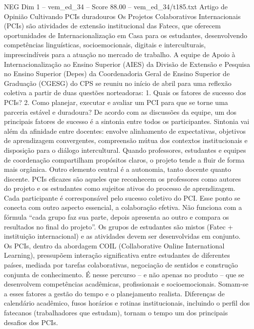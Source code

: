 \begin{textsample}{NEG Dim 1 – vem\_ed\_34 – Score 88.00 – vem\_ed\_34/t185.txt}  \label{ex:f1_neg_184}
Artigo de Opinião Cultivando PCIs duradouros Os Projetos Colaborativos Internacionais (PCIs) são atividades de extensão institucional das Fatecs, que oferecem oportunidades de Internacionalização em Casa para os estudantes, desenvolvendo competências linguísticas, socioemocionais, digitais e interculturais, imprescindíveis para a atuação no mercado de trabalho.
A equipe de Apoio à Internacionalização ao Ensino Superior (AIES) da Divisão de Extensão e Pesquisa no Ensino Superior (Depes) da Coordenadoria Geral de Ensino Superior de Graduação (CGESG) do CPS se reuniu no início de abril para uma reflexão coletiva a partir de duas questões norteadoras: 1.
Quais os fatores de sucesso dos PCIs? 2.
Como planejar, executar e avaliar um PCI para que se torne uma parceria estável e duradoura?
De acordo com as discussões da equipe, um dos principais fatores de sucesso é a sintonia entre todos os participantes.
Sintonia vai além da afinidade entre docentes: envolve alinhamento de expectativas, objetivos de aprendizagem convergentes, compreensão mútua dos contextos institucionais e disposição para o diálogo intercultural.
Quando professores, estudantes e equipes de coordenação compartilham propósitos claros, o projeto tende a fluir de forma mais orgânica.
Outro elemento central é a autonomia, tanto docente quanto discente.
PCIs eficazes são aqueles que reconhecem os professores como autores do projeto e os estudantes como sujeitos ativos do processo de aprendizagem.
Cada participante é corresponsável pelo sucesso coletivo do PCI.
Esse ponto se conecta com outro aspecto essencial, a colaboração efetiva.
Não funciona com a fórmula “cada grupo faz sua parte, depois apresenta ao outro e compara os resultados no final do projeto”.
Os grupos de estudantes são mistos (Fatec + instituição internacional) e as atividades devem ser desenvolvidas em conjunto.
Os PCIs, dentro da abordagem COIL (Collaborative Online International Learning), pressupõem interação significativa entre estudantes de diferentes países, mediada por tarefas colaborativas, negociação de sentidos e construção conjunta de conhecimento.
É nesse percurso – e não apenas no produto – que se desenvolvem competências acadêmicas, profissionais e socioemocionais.
Somam-se a esses fatores a gestão do tempo e o planejamento realista.
Diferenças de calendário acadêmico, fusos horários e rotinas institucionais, incluindo o perfil dos fatecanos (trabalhadores que estudam), tornam o tempo um dos principais desafios dos PCIs.

\end{textsample}
